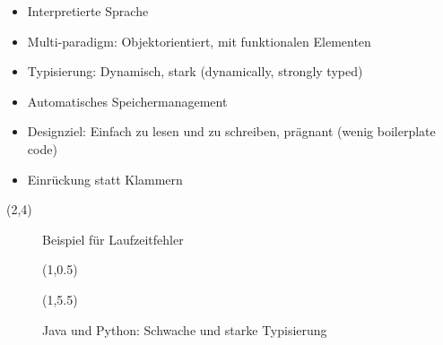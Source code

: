 \begin{frame}[fragile]{}
    \begin{itemize}
        \item Interpretierte Sprache
        \item<4-> Multi-paradigm: Objektorientiert, mit funktionalen Elementen
        \item<4-> Typisierung: Dynamisch, stark (dynamically, strongly typed)
        \item<6-> Automatisches Speichermanagement
        \item<7-> Designziel: Einfach zu lesen und zu schreiben, prägnant (wenig boilerplate code)
        \item<7-> Einrückung statt Klammern
    \end{itemize}
     {
        \begin{textblock}{10}(2,4)
            \begin{figure}
                
                \caption{Beispiel für Laufzeitfehler}
            \end{figure}
        \end{textblock}    
    }
     {
        \begin{figure}
            \begin{textblock}{14}(1,0.5)
                
            \end{textblock}    
            \begin{textblock}{14}(1,5.5)
                
                \caption{Java und Python: Schwache und starke Typisierung}
            \end{textblock}    
        \end{figure}
    }
\end{frame}
